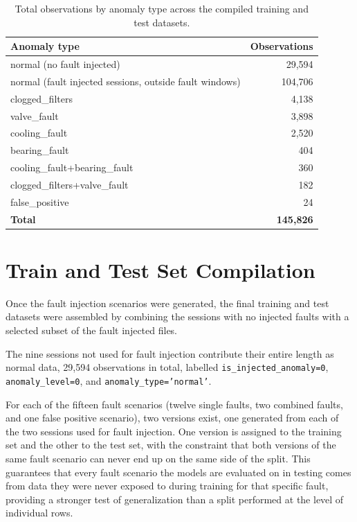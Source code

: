 \begin{table}[htbp]
\centering
\caption{Total observations by anomaly type across the compiled training and test datasets.}
\label{tab:fault_data_totals}
\small
\begin{tabular}{lr}
\hline
\textbf{Anomaly type} & \textbf{Observations} \\
\hline
normal (no fault injected)                              & 29{,}594  \\
normal (fault injected sessions, outside fault windows) & 104{,}706 \\
clogged\_filters                                        & 4{,}138   \\
valve\_fault                                             & 3{,}898   \\
cooling\_fault                                           & 2{,}520   \\
bearing\_fault                                           & 404     \\
cooling\_fault+bearing\_fault                            & 360     \\
clogged\_filters+valve\_fault                            & 182     \\
false\_positive                                          & 24      \\
\hline
\textbf{Total} & \textbf{145{,}826} \\
\hline
\end{tabular}
\end{table}


\section{Train and Test Set Compilation} \label{sec:training_compilation}

Once the fault injection scenarios were generated, the final training and test datasets were assembled by 
combining the sessions with no injected faults with a selected subset of the fault injected files.

The nine sessions not used for fault injection contribute their entire length as normal data, 29{,}594 
observations in total, labelled \texttt{is\_injected\_anomaly=0}, \texttt{anomaly\_level=0}, and 
\texttt{anomaly\_type='normal'}.

For each of the fifteen fault scenarios (twelve single faults, two combined faults, and one false positive 
scenario), two versions exist, one generated from each of the two sessions used for fault injection. One 
version is assigned to the training set and the other to the test set, with the constraint that both 
versions of the same fault scenario can never end up on the same side of the split. This guarantees that 
every fault scenario the models are evaluated on in testing comes from data they were never exposed to 
during training for that specific fault, providing a stronger test of generalization than a split 
performed at the level of individual rows.

